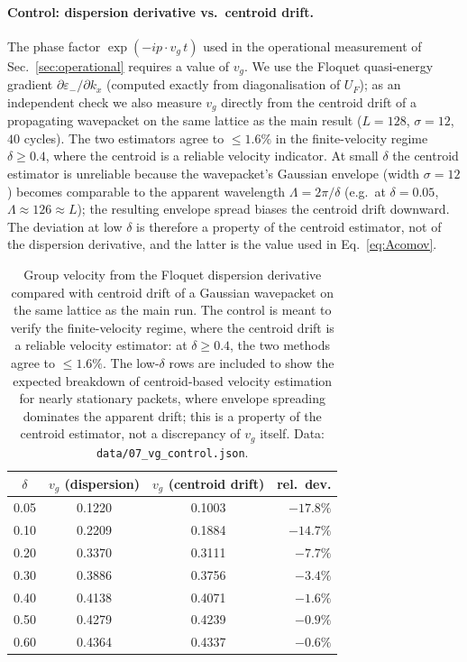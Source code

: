 \documentclass[11pt,a4paper]{article}
\begin{document}
\paragraph{Control: dispersion derivative vs.\ centroid drift.}
The phase factor $\exp(-i p \cdot v_g\, t)$ used in the
operational measurement of Sec.~\ref{sec:operational} requires
a value of $v_g$. We use the Floquet quasi-energy gradient
$\partial \varepsilon_- / \partial k_x$ (computed exactly from
diagonalisation of $U_F$); as an independent check we also
measure $v_g$ directly from the centroid drift of a
propagating wavepacket on the same lattice as the main result
($L = 128$, $\sigma = 12$, $40$ cycles). The two estimators
agree to $\le 1.6\%$ in the finite-velocity regime
$\delta \ge 0.4$, where the centroid is a reliable velocity
indicator. At small $\delta$ the centroid estimator is unreliable
because the wavepacket's Gaussian envelope (width $\sigma = 12$)
becomes comparable to the apparent wavelength
$\Lambda = 2\pi/\delta$ (e.g.\ at $\delta = 0.05$,
$\Lambda \approx 126 \approx L$); the resulting envelope
spread biases the centroid drift downward. The deviation at
low $\delta$ is therefore a property of the centroid estimator,
not of the dispersion derivative, and the latter is the value
used in Eq.~\eqref{eq:Acomov}.

\begin{table}[h]
\centering
\begin{tabular}{cccr}
\toprule
$\delta$ & $v_g$ (dispersion) & $v_g$ (centroid drift)
& rel.\ dev.\\
\midrule
0.05 & 0.1220 & 0.1003 & $-17.8\%$\\
0.10 & 0.2209 & 0.1884 & $-14.7\%$\\
0.20 & 0.3370 & 0.3111 & $-7.7\%$\\
0.30 & 0.3886 & 0.3756 & $-3.4\%$\\
0.40 & 0.4138 & 0.4071 & $-1.6\%$\\
0.50 & 0.4279 & 0.4239 & $-0.9\%$\\
0.60 & 0.4364 & 0.4337 & $-0.6\%$\\
\bottomrule
\end{tabular}
\caption{Group velocity from the Floquet dispersion derivative
compared with centroid drift of a Gaussian wavepacket on the
same lattice as the main run. The control is meant to verify
the finite-velocity regime, where the centroid drift is a
reliable velocity estimator: at $\delta \ge 0.4$, the two
methods agree to $\le 1.6\%$. The low-$\delta$ rows are
included to show the expected breakdown of centroid-based
velocity estimation for nearly stationary packets, where
envelope spreading dominates the apparent drift; this is a
property of the centroid estimator, not a discrepancy of
$v_g$ itself. Data: \texttt{data/07\_vg\_control.json}.}
\label{tab:vg_control}
\end{table}
\end{document}

